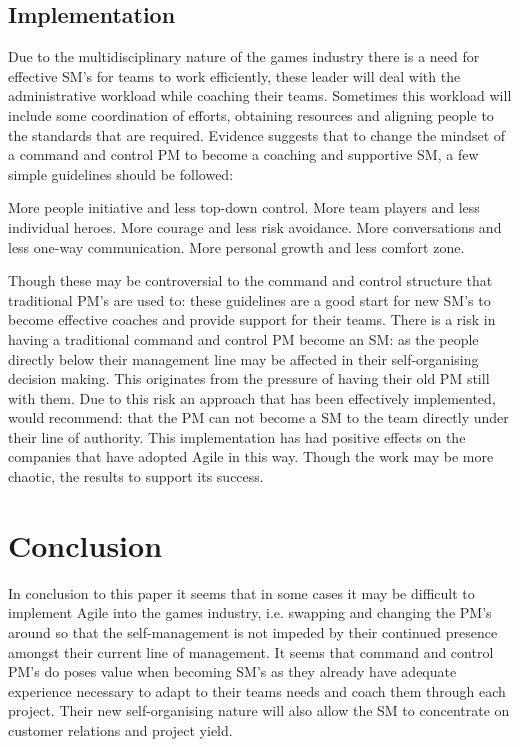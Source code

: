 \documentclass{scrartcl}
\begin{document}
\subsection{Implementation}

Due to the multidisciplinary nature of the games industry there is a need for effective SM's for teams to work efficiently, these leader will deal with the administrative workload while coaching their teams. Sometimes this workload will include some coordination of efforts, obtaining resources and aligning people to the standards that are required\cite{Oxymoron,Together,Behavior,ManagerMaster}. Evidence suggests that to change the mindset of a command and control PM to become a coaching and supportive SM, a few simple guidelines should be followed:
\begin{center}
	More people initiative and less top-down control.
		\newline
	More team players and less individual heroes.
		\newline
	More courage and less risk avoidance.
		\newline
	More conversations and less one-way communication.
		\newline
	More personal growth and less comfort zone\cite{AdoptAgile}.
		\newline
\end{center}

Though these may be controversial to the command and control structure that traditional PM's are used to: these guidelines are a good start for new SM's to become effective coaches and provide support for their teams\cite{Leader,AdoptAgile}. There is a risk in having a traditional command and control PM become an SM: as the people directly below their management line may be affected in their self-organising decision making. This originates from the pressure of having their old PM still with them\cite{ManagerMaster}. Due to this risk an approach that has been effectively implemented, would recommend: that the PM can not become a SM to the team directly under their line of authority\cite{ManagerMaster,Together}. This implementation has had positive effects on the companies that have adopted Agile in this way. Though the work may be more chaotic\cite{Chaos}, the results to support its success\cite{LeaderUnleashed}.

\section{Conclusion}

In conclusion to this paper it seems that in some cases it may be difficult to implement Agile into the games industry, i.e. swapping and changing the PM's around so that the self-management is not impeded by their continued presence amongst their current line of management. It seems that command and control PM's do poses value when becoming SM's as they already have adequate experience necessary to adapt to their teams needs and coach them through each project. Their new self-organising nature will also allow the SM to concentrate on customer relations and project yield.



\end{document}
